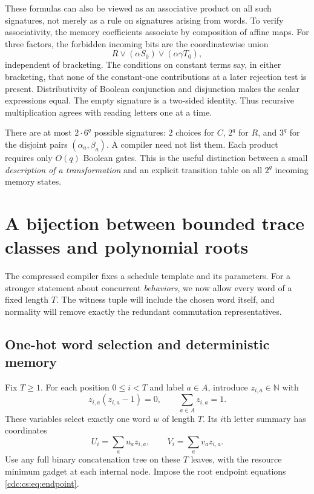 \documentclass[11pt,a4paper]{article}
\theoremstyle{definition}
\theoremstyle{remark}
\newcommand{\N}{\mathbb N}
\newcommand{\srctag}[1]{\texorpdfstring{\hspace{0.5em}{\normalfont\small\color{accent}[#1]}}{ [#1]}}
\begin{document}
These formulas can also be viewed as an associative product on all such
signatures, not merely as a rule on signatures arising from words. To verify
associativity, the memory coefficients associate by composition of affine
maps. For three factors, the forbidden incoming bits are the coordinatewise
union
\[
R\lor(\alpha S_0)\lor(\alpha\gamma T_0),
\]
independent of bracketing. The conditions on constant terms say, in either
bracketing, that none of the constant-one contributions at a later rejection
test is present. Distributivity of Boolean conjunction and disjunction makes
the scalar expressions equal. The empty signature is a two-sided identity.
Thus recursive multiplication agrees with reading letters one at a time.

There are at most $2\cdot 6^q$ possible signatures: $2$ choices for $C$, $2^q$
for $R$, and $3^q$ for the disjoint pairs $(\alpha_a,\beta_a)$. A compiler need
not list them. Each product requires only $O(q)$ Boolean gates. This is the
useful distinction between a small \emph{description of a transformation}
and an explicit transition table on all $2^q$ incoming memory states.


\section{A bijection between bounded trace classes and polynomial roots\srctag{06}}
\label{cdc:cs:sec:counting}

The compressed compiler fixes a schedule template and its parameters. For a
stronger statement about concurrent \emph{behaviors}, we now allow every word
of a fixed length $T$. The witness tuple will include the chosen word itself,
and normality will remove exactly the redundant commutation representatives.

\subsection{One-hot word selection and deterministic memory}

Fix $T\geq1$. For each position $0\leq i<T$ and label $a\in A$, introduce
$z_{i,a}\in\N$ with
\begin{equation}
\label{cdc:cs:eq:onehot}
z_{i,a}(z_{i,a}-1)=0,\qquad
\sum_{a\in A}z_{i,a}=1.
\end{equation}
These variables select exactly one word $w$ of length $T$. Its $i$th letter
summary has coordinates
\begin{equation}
\label{cdc:cs:eq:selectedsummary}
U_i=\sum_a u_a z_{i,a},\qquad V_i=\sum_a v_a z_{i,a}.
\end{equation}
Use any full binary concatenation tree on these $T$ leaves, with the resource
minimum gadget at each internal node. Impose the root endpoint equations
\eqref{cdc:cs:eq:endpoint}.
\end{document}
